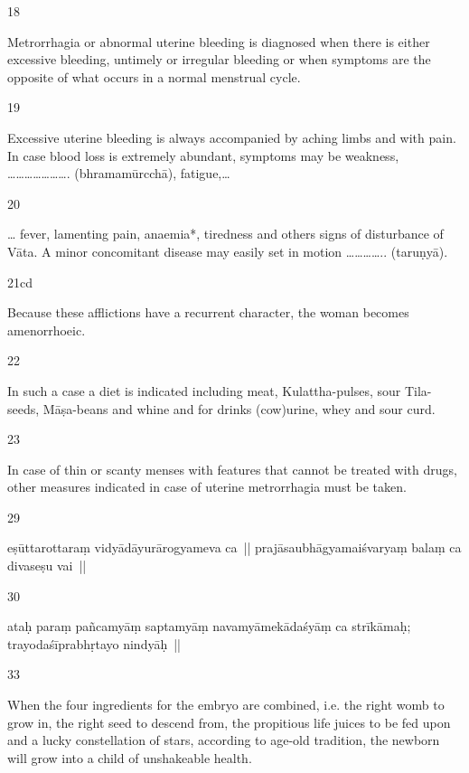 \begin{translation}
\begin{tt}
\item[18]

Metrorrhagia or abnormal uterine bleeding is diagnosed when there is 
  either excessive bleeding, untimely or irregular bleeding or when symptoms are 
  the opposite of what occurs in a normal menstrual cycle. 
  
\item[19]

 Excessive uterine bleeding is always accompanied by aching limbs and 
  with pain. In case blood loss is extremely abundant, symptoms may be 
  weakness, …………………. (bhramamūrcchā), fatigue,…
  
\item[20]

… fever, lamenting pain, anaemia*, tiredness and others signs of 
  disturbance of Vāta. A minor concomitant disease may easily set in motion 
  ………….. (taruṇyā).
  
\item[21cd]

Because these afflictions have a recurrent character, the woman 
  becomes amenorrhoeic. 
  
\item[22]

In such a case a diet is indicated including meat, Kulattha-pulses, sour 
  Tila-seeds, Māṣa-beans and whine and for drinks (cow)urine, whey and sour 
  curd.
  
\item[23]

In case of thin or scanty menses with features that cannot be treated 
  with drugs, other measures indicated in case of uterine metrorrhagia must be 
  taken. 
  
\item[29]


  eṣūttarottaraṃ vidyādāyurārogyameva ca || prajāsaubhāgyamaiśvaryaṃ balaṃ 
  ca divaseṣu vai ||
  
\item[30]


  ataḥ paraṃ pañcamyāṃ saptamyāṃ navamyāmekādaśyāṃ ca strīkāmaḥ; 
  trayodaśīprabhṛtayo nindyāḥ ||
  
\item[33]

 When the four ingredients for the embryo are combined, i.e. the right 
  womb to grow in, the right seed to descend from, the propitious life juices to be 
  fed upon and a lucky constellation of stars, according to age-old tradition, the 
  newborn will grow into a child of unshakeable health. 
  

\end{tt}
\end{translation}
